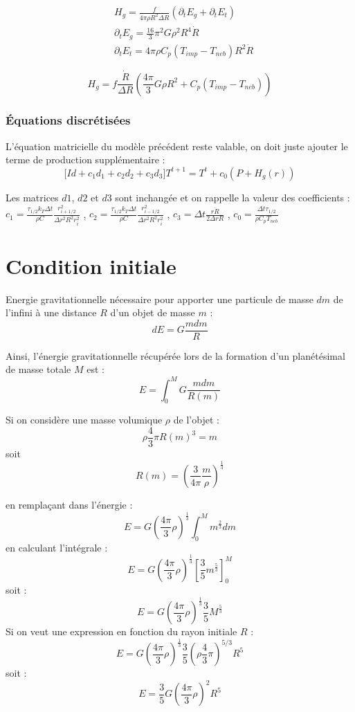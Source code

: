 \documentclass[10pt,a4paper]{article}
\numberwithin{equation}{section}
\begin{document}
\begin{align}
 &H_g = \frac{f}{4 \pi \rho R^2 \Delta R}(\partial_{t} E_g + \partial_{t} E_t) \\
 &\partial_{t} E_g =\frac{16}{3} \pi^2 G \rho^2 R^4 \dot R \\
 &\partial_{t} E_t = 4 \pi \rho C_p ( T_{imp} - T_{neb} ) R^2 \dot R
\end{align}

\begin{equation}
H_g = f\frac{\dot R}{\Delta R}(\frac{4 \pi}{3} G\rho R^2 + C_p ( T_{imp} - T_{neb} ) )
\end{equation}


\subsubsection{Équations discrétisées}

L'équation matricielle du modèle précédent reste valable, on doit juste ajouter le terme de production supplémentaire :
\begin{equation}
\Big [ Id + 
c_1  d_1 +  
c_2  d_2 +
c_3  d_3
 \Big] T^{t+1} = T^t + c_0 (P + H_g(r))
\end{equation}

Les matrices $d1$, $d2$ et $d3$ sont inchangée et on rappelle la valeur des coefficients : \\
$c_1 = \frac{\tau_{1/2} k_T \Delta t }{\rho C  }
\frac{r^2_{i+1/2}}{\Delta r^2 R^2 r^2_i}$
, $c_2 = \frac{\tau_{1/2} k_T \Delta t }{\rho C  }
\frac{r^2_{i-1/2}}{\Delta r^2 R^2 r^2_i}$
, $c_3 = \Delta t \frac{ r \dot{R}}{2\Delta r R}$
, $c_0 = \frac{\Delta t \tau_{1/2} }{\rho C_p T_{neb}}$ 

\section{Condition initiale}

Energie gravitationnelle nécessaire pour apporter une particule de masse $dm$ de l'infini à une distance $R$ d'un objet de masse $m$ :
$$ dE = G \frac{m dm}{R}$$ 

Ainsi, l'énergie gravitationnelle récupérée lors de la formation d'un planétésimal de masse totale $M$ est :
$$ E = \int_0^M G \frac{m dm}{R(m)}$$

Si on considère une masse volumique $\rho$ de l'objet :
$$\rho\frac{4}{3}\pi R(m)^3=m$$
soit 
$$R(m)=\left(\frac{3}{4\pi}\frac{m}{\rho}\right)^{\frac{1}{3}}$$

en remplaçant dans l'énergie :
$$E=G\left(\frac{4\pi}{3}\rho\right)^\frac{1}{3}\int_0^M m^\frac{2}{3}dm$$
en calculant l'intégrale :
$$E=G\left(\frac{4\pi}{3}\rho\right)^\frac{1}{3}\left[\frac{3}{5} m^\frac{5}{3}\right]_0^M$$
soit :
$$E=G\left(\frac{4\pi}{3}\rho\right)^\frac{1}{3}\frac{3}{5} M^\frac{5}{3}$$
Si on veut une expression en fonction du rayon initiale $R$ :
$$E=G\left(\frac{4\pi}{3}\rho\right)^\frac{1}{3}\frac{3}{5} \left(\rho\frac{4}{3}\pi\right)^{5/3}R^5$$
soit :
$$E=\frac{3}{5}G\left(\frac{4\pi}{3}\rho\right)^2 R^5$$
\end{document}
